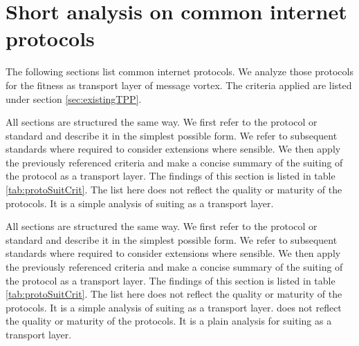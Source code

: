 \documentclass[a4paper,appendixprefix,pdfusetitle,twocolumn,fontsize=8pt,draft,DIV=calc]{scrbook}
\begin{document}
\mainmatter







\onecolumn
\appendix
{}%
\renewcommand*{\thepage}{A\arabic{page}}



\gdef\rfc{../../../../rfc/src/xml2rfc/draft-gwerder-messagevortexmain-03.pdf}
%



\twocolumn\clearpage
\chapter{Short analysis on common internet protocols\label{app:transportProtocols}}
The following sections list common internet protocols. We analyze those protocols for the fitness as transport layer of message vortex. The criteria applied are listed under section \ref{sec:existingTPP}.

All sections are structured the same way. We first refer to the protocol or standard and describe it in the simplest possible form. We refer to subsequent standards where required to consider extensions where sensible. We then apply the previously referenced criteria and make a concise summary of the suiting of the protocol as a transport layer. The findings of this section is listed in table \ref{tab:protoSuitCrit}. The list here does not reflect the quality or maturity of the protocols. It is a simple analysis of suiting as a transport layer.


All sections are structured the same way. We first refer to the protocol or standard and describe it in the simplest possible form. We refer to subsequent standards where required to consider extensions where sensible. We then apply the previously referenced criteria and make a concise summary of the suiting of the protocol as a transport layer. The findings of this section is listed in table \ref{tab:protoSuitCrit}. The list here does not reflect the quality or maturity of the protocols. It is a simple analysis of suiting as a transport layer.
 does not reflect the quality or maturity of the protocols. It is a plain analysis for suiting as a transport layer.
\end{document}
